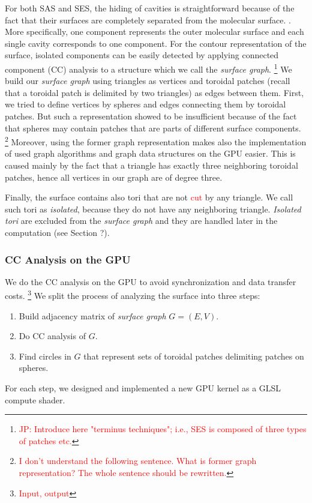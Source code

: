 
For both SAS and SES, the hiding of cavities is straightforward because of the fact that their surfaces are completely separated from the molecular surface. \textcolor{red}{\cite{borland2011ambient}}.
More specifically, one component represents the outer molecular surface and each single cavity corresponds to one component.
For the contour representation of the surface, isolated components can be easily detected by applying connected component (CC) analysis to a structure which we call the \textit{surface graph}.
\footnote{\textcolor{red}{JP: Introduce here "terminus techniques"; i.e., SES is composed of three types of patches etc.}}
We build our \textit{surface graph} using triangles as vertices and toroidal patches (recall that a toroidal patch is delimited by two triangles) as edges between them.
First, we tried to define vertices by spheres and edges connecting them by toroidal patches. 
But such a representation showed to be insufficient because of the fact that spheres may contain patches that are parts of different surface components.
\footnote{\textcolor{red}{I don't understand the following sentence. What is former graph representation? The whole sentence should be rewritten.}} Moreover, using the former graph representation makes also the implementation of used graph algorithms and graph data structures on the GPU easier.
This is caused mainly by the fact that a triangle has exactly three neighboring toroidal patches, hence all vertices in our graph are of degree three.

Finally, the surface contains also tori that are not \textcolor{red}{cut} by any triangle.
We call such tori as \textit{isolated}, because they do not have any neighboring triangle.
\textit{Isolated tori} are excluded from the \textit{surface graph} and they are handled later in the computation (see Section ?).

\subsubsection{CC Analysis on the GPU}

We do the CC analysis on the GPU to avoid synchronization and data transfer costs.
\footnote{\textcolor{red}{Input, output}}
We split the process of analyzing the surface into three steps:
\begin{enumerate}
  \item Build adjacency matrix of \textit{surface graph} $G = (E, V)$.
	\item Do CC analysis of $G$.
	\item Find circles in $G$ that represent sets of toroidal patches delimiting patches on spheres.
\end{enumerate}
For each step, we designed and implemented a new GPU kernel as a GLSL compute shader.

